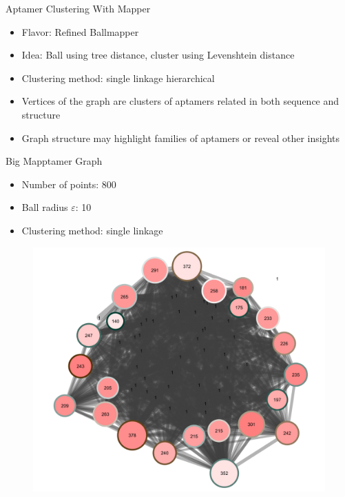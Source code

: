 \documentclass{beamer}
\begin{document}
\begin{frame}{Aptamer Clustering With Mapper}
  \begin{itemize}
    \item Flavor: Refined Ballmapper
    \item Idea: Ball using tree distance, cluster using Levenshtein distance
    \item Clustering method: single linkage hierarchical
    \item Vertices of the graph are clusters of aptamers related in both sequence and structure
    \item Graph structure may highlight families of aptamers or reveal other insights
  \end{itemize}
\end{frame}

\begin{frame}{Big Mapptamer Graph}
  \begin{itemize}
    \item Number of points: 800
    \item Ball radius $\varepsilon$: 10
    \item Clustering method: single linkage
  \end{itemize}
  \begin{figure}
    \begin{center}
      \includegraphics[width=.7\textwidth]{fullmaptamer.png}
    \end{center}
  \end{figure}
\end{frame}
\end{document}
